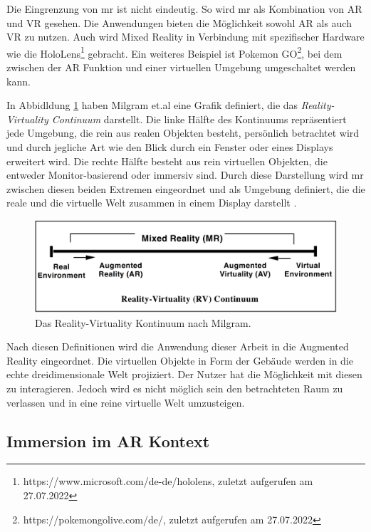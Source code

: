 Die Eingrenzung von \acrshort{mr} ist nicht eindeutig. So wird \acrshort{mr} als Kombination von AR und VR gesehen. Die Anwendungen bieten die Möglichkeit sowohl AR als auch VR zu nutzen. Auch wird Mixed Reality in Verbindung mit spezifischer Hardware wie die HoloLens\footnote{https://www.microsoft.com/de-de/hololens, zuletzt aufgerufen am 27.07.2022} gebracht. Ein weiteres Beispiel ist Pokemon GO\footnote{https://pokemongolive.com/de/, zuletzt aufgerufen am 27.07.2022}, bei dem zwischen der AR Funktion und einer virtuellen Umgebung umgeschaltet werden kann.

In Abbidldung \ref*{fig: RV_Kontinuum} haben Milgram et.al eine Grafik definiert, die das \textit{Reality-Virtuality Continuum} darstellt. Die linke Hälfte des Kontinuums repräsentiert jede Umgebung, die rein aus realen Objekten besteht, persönlich betrachtet wird und durch jegliche Art wie den Blick durch ein Fenster oder eines Displays erweitert wird. Die rechte Hälfte besteht aus rein virtuellen Objekten, die entweder Monitor-basierend oder immersiv sind. Durch diese Darstellung wird \acrshort{mr} zwischen diesen beiden Extremen eingeordnet und als Umgebung definiert, die die reale und die virtuelle Welt zusammen in einem Display darstellt \cite{Milgram1995}.

\begin{figure}[H]
    \centering
    \includegraphics[width=\textwidth]{img/einordnung_vr_ar_mr/vr_ar_mr_kontinuum.jpg}
    \caption{Das Reality-Virtuality Kontinuum nach Milgram\cite{Milgram1995}.}
    \label{fig: RV_Kontinuum}
\end{figure}

Nach diesen Definitionen wird die Anwendung dieser Arbeit in die Augmented Reality eingeordnet. Die virtuellen Objekte in Form der Gebäude werden in die echte dreidimensionale Welt projiziert. Der Nutzer hat die Möglichkeit mit diesen zu interagieren. Jedoch wird es nicht möglich sein den betrachteten Raum zu verlassen und in eine reine virtuelle Welt umzusteigen. 

\subsection{Immersion im AR Kontext}
\label{immersion}
